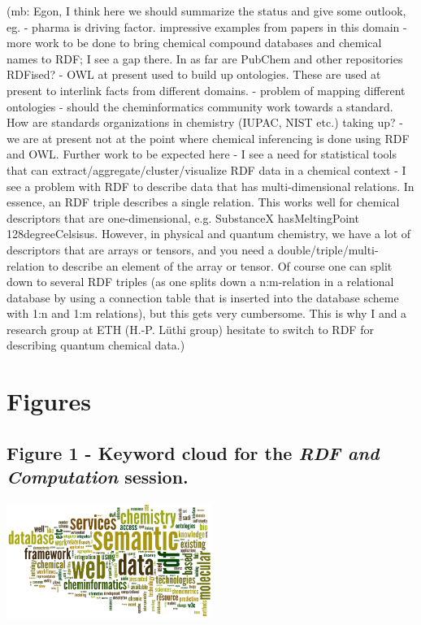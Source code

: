 \documentclass[10pt]{bmc_article}
\newenvironment{bmcformat}{\begin{raggedright}\baselineskip20pt\sloppy\setboolean{publ}{false}}{\end{raggedright}\baselineskip20pt\sloppy}
\begin{document}
\begin{bmcformat}
(mb: Egon, I think here we should summarize the status and give some outlook, eg. 
- pharma is driving factor. impressive examples from papers in this domain
- more work to be done to bring chemical compound databases and chemical names
to RDF; I see a gap there. In as far are PubChem and other repositories RDFised?
- OWL at present used to build up ontologies. These are used at present to
interlink facts from different domains. 
- problem of mapping different ontologies - should the cheminformatics community
work towards a standard. How are standards organizations in chemistry (IUPAC,
NIST etc.) taking up?
- we are at present not at the point where chemical inferencing is done using
RDF and OWL. Further work to be expected here
- I see a need for statistical tools that can
extract/aggregate/cluster/visualize RDF data in a chemical context
- I see a problem with RDF to describe data that has multi-dimensional
relations. In essence, an RDF triple describes a single relation. This works
well for chemical descriptors that are one-dimensional, e.g. SubstanceX
hasMeltingPoint 128degreeCelsisus. However, in physical and quantum chemistry,
we have a lot of descriptors that are arrays or tensors, and you need a
double/triple/multi-relation to describe an element of the array or tensor. Of
course one can split down to several RDF triples (as one splits down a
n:m-relation in a relational database by using a connection table that is
inserted into the database scheme with 1:n and 1:m relations), but this gets
very cumbersome. This is why I and a research group at ETH (H.-P. Lüthi group)
hesitate to switch to RDF for describing quantum chemical data.)






{
   }     %



\clearpage

\section*{Figures}
  \subsection*{Figure 1 - Keyword cloud for the \textit{RDF and Computation} session.}
  \includegraphics[width=0.5\textwidth]{graphics/wordle_cinf003} 


\end{bmcformat}
\end{document}
